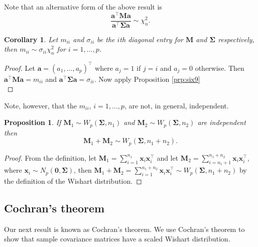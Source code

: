 \documentclass[]{book}
\newtheorem{corollary}{Corollary}[chapter]
\newtheorem{proposition}{Proposition}[chapter]
\theoremstyle{definition}
\theoremstyle{definition}
\theoremstyle{definition}
\theoremstyle{remark}
\begin{document}
Note that an alternative form of the above result is
\[\frac{ \boldsymbol a^\top \boldsymbol M\boldsymbol a}{ \boldsymbol a^\top \boldsymbol \Sigma\boldsymbol a} \sim \chi_n^2.\]

\begin{corollary}
\protect\hypertarget{cor:csix4}{}{\label{cor:csix4} }Let \(m_{ii}\) and \(\sigma_{ii}\) be the \(i\)th diagonal entry for \(\boldsymbol M\) and \(\boldsymbol \Sigma\) respectively, then \(m_{ii} \sim \sigma_{ii} \chi^2_n\) for \(i=1,\ldots,p\).
\end{corollary}

\begin{proof}
{}Let \(\boldsymbol a= (a_1,\ldots,a_p)^\top\) where \(a_j = 1\) if \(j=i\) and \(a_j = 0\) otherwise. Then \(\boldsymbol a^\top \boldsymbol M\boldsymbol a= m_{ii}\) and \(\boldsymbol a^\top \boldsymbol \Sigma\boldsymbol a= \sigma_{ii}\). Now apply Proposition \ref{prp:six9}\\
\end{proof}

Note, however, that the \(m_{ii}\), \(i=1,\ldots,p\), are not, in general, independent.

\begin{proposition}
\protect\hypertarget{prp:six10}{}{\label{prp:six10} }If \(\boldsymbol M_1 \sim W_p(\boldsymbol \Sigma,n_1)\) and \(\boldsymbol M_2 \sim W_p(\boldsymbol \Sigma,n_2)\) are independent
then
\[\boldsymbol M_1 + \boldsymbol M_2 \sim W_p(\boldsymbol \Sigma,n_1 + n_2).\]
\end{proposition}

\begin{proof}
{}From the definition, let \(\boldsymbol M_1 = \sum_{i=1}^{n_1} \boldsymbol x_i \boldsymbol x_i^\top\) and let \(\boldsymbol M_2 = \sum_{i=n_1+1}^{n_1+n_2} \boldsymbol x_i \boldsymbol x_i^\top\), where \(\boldsymbol x_i \sim N_p(\boldsymbol 0,\boldsymbol \Sigma)\), then \(\boldsymbol M_1+\boldsymbol M_2 = \sum_{i=1}^{n_1+n_2} \boldsymbol x_i \boldsymbol x_i^\top \sim W_p(\boldsymbol \Sigma,n_1 + n_2)\) by the definition of the Wishart distribution.
\end{proof}

\hypertarget{cochrans-theorem}{%
\subsection{Cochran's theorem}\label{cochrans-theorem}}

Our next result is known as Cochran's theorem. We use Cochran's theorem to show that sample covariance matrices have a scaled Wishart distribution.
\end{document}
